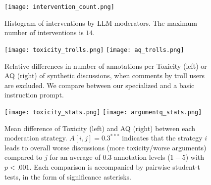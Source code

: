 \begin{figure}[t]
	\centering
	\texttt{[image: intervention\_count.png]}
	\caption{Histogram of interventions by \ac{LLM} moderators. The maximum number of interventions is $14$.}
	\label{fig:intervention_count}
\end{figure}

\begin{figure}[t]
    \centering
    \texttt{[image: toxicity\_trolls.png]} \hfill
    \texttt{[image: aq\_trolls.png]}
    \caption{Relative differences in number of annotations per Toxicity (left) or \ac{AQ} (right) of synthetic discussions, when comments by troll users are excluded. We compare between our specialized and a basic instruction prompt.}
    \label{fig:boxplots}
\end{figure}

\begin{figure*}[t]
    \texttt{[image: toxicity\_stats.png]} \hfill
    \texttt{[image: argumentq\_stats.png]}
	\centering
	\caption{Mean difference of Toxicity (left) and \ac{AQ} (right) between each moderation strategy. $A[i, j] = 0.3^{***}$ indicates that the strategy $i$ leads to overall worse discussions (more toxicity/worse arguments) compared to $j$ for an average of $0.3$ annotation levels ($1-5$) with $p<.001$. Each comparison is accompanied by pairwise student-t tests, in the form of significance asterisks.}
	\label{fig:toxicity_aq_stats}
\end{figure*}

